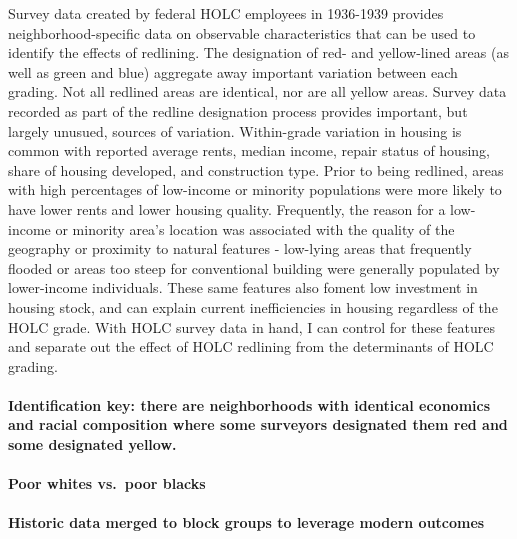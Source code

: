 \documentclass[
]{article}
\begin{document}
Survey data created by federal HOLC employees in 1936-1939 provides
neighborhood-specific data on observable characteristics that can be
used to identify the effects of redlining. The designation of red- and
yellow-lined areas (as well as green and blue) aggregate away important
variation between each grading. Not all redlined areas are identical,
nor are all yellow areas. Survey data recorded as part of the redline
designation process provides important, but largely unusued, sources of
variation. Within-grade variation in housing is common with reported
average rents, median income, repair status of housing, share of housing
developed, and construction type. Prior to being redlined, areas with
high percentages of low-income or minority populations were more likely
to have lower rents and lower housing quality. Frequently, the reason
for a low-income or minority area's location was associated with the
quality of the geography or proximity to natural features - low-lying
areas that frequently flooded or areas too steep for conventional
building were generally populated by lower-income individuals. These
same features also foment low investment in housing stock, and can
explain current inefficiencies in housing regardless of the HOLC grade.
With HOLC survey data in hand, I can control for these features and
separate out the effect of HOLC redlining from the determinants of HOLC
grading.

\hypertarget{identification-key-there-are-neighborhoods-with-identical-economics-and-racial-composition-where-some-surveyors-designated-them-red-and-some-designated-yellow.}{%
\paragraph{Identification key: there are neighborhoods with identical
economics and racial composition where some surveyors designated them
red and some designated
yellow.}\label{identification-key-there-are-neighborhoods-with-identical-economics-and-racial-composition-where-some-surveyors-designated-them-red-and-some-designated-yellow.}}

\hypertarget{poor-whites-vs.-poor-blacks}{%
\paragraph{Poor whites vs.~poor
blacks}\label{poor-whites-vs.-poor-blacks}}

\hypertarget{historic-data-merged-to-block-groups-to-leverage-modern-outcomes}{%
\paragraph{Historic data merged to block groups to leverage modern
outcomes}\label{historic-data-merged-to-block-groups-to-leverage-modern-outcomes}}
\end{document}
